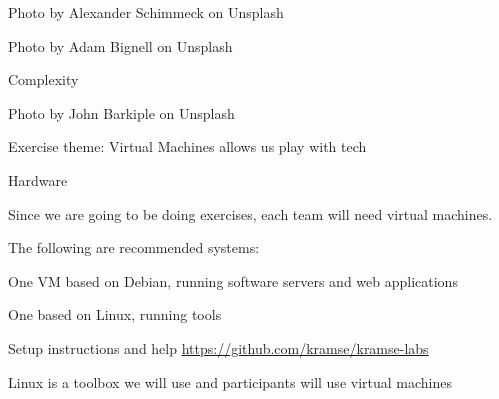 \documentclass[Screen16to9,17pt]{foils}
\begin{document}
\begin{list2}
\item
\end{list2}





\begin{list2}
\item
\end{list2}

\hfill Photo by Alexander Schimmeck on Unsplash



\begin{list2}
\item
\end{list2}
 \hfill Photo by Adam Bignell on Unsplash



\begin{list2}
\item Complexity
\item

\end{list2}
\hfill Photo by John Barkiple on Unsplash




Exercise theme: Virtual Machines allows us play with tech

Hardware

Since we are going to be doing exercises, each team will need virtual machines.

The following are recommended systems:
\begin{list2}
\item One VM based on Debian, running software servers and web applications
\item One based on Linux, running tools
\item Setup instructions and help \url{https://github.com/kramse/kramse-labs}
\end{list2}

Linux is a toolbox we will use and participants will use virtual machines
\end{document}
